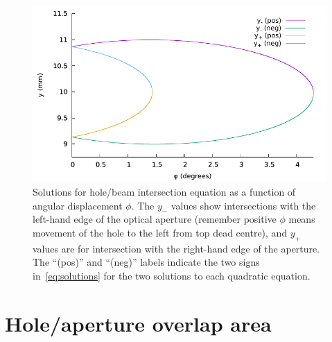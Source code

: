 \documentclass[a4paper,11pt,article]{memoir}
\begin{document}
\begin{figure}
  \begin{center}
    \includegraphics[width=\textwidth]{intersection-solutions}
  \end{center}

  \caption{Solutions for hole/beam intersection equation as a function
    of angular displacement $\phi$. The $y_{-}$ values show
    intersections with the left-hand edge of the optical aperture
    (remember positive $\phi$ means movement of the hole to the left
    from top dead centre), and $y_{+}$ values are for intersection
    with the right-hand edge of the aperture. The ``(pos)'' and
    ``(neg)'' labels indicate the two signs in~\eqref{eq:solutions}
    for the two solutions to each quadratic
    equation.}\label{fig:solutions}
\end{figure}

\section*{Hole/aperture overlap area}
\end{document}
